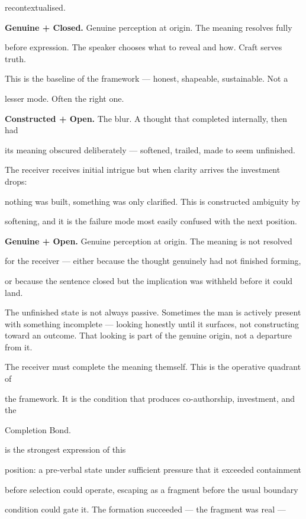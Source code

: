 recontextualised.

\textbf{Genuine + Closed.} Genuine perception at origin. The meaning resolves fully

before expression. The speaker chooses what to reveal and how. Craft serves truth.

This is the baseline of the framework --- honest, shapeable, sustainable. Not a

lesser mode. Often the right one.

\textbf{Constructed + Open.} The blur. A thought that completed internally, then had

its meaning obscured deliberately --- softened, trailed, made to seem unfinished.

The receiver receives initial intrigue but when clarity arrives the investment drops:

nothing was built, something was only clarified. This is constructed ambiguity by

softening, and it is the failure mode most easily confused with the next position.

\textbf{Genuine + Open.} Genuine perception at origin. The meaning is not resolved

for the receiver --- either because the thought genuinely had not finished forming,

or because the sentence closed but the implication was withheld before it could land.

The unfinished state is not always passive. Sometimes the man is actively present
with something incomplete --- looking honestly until it surfaces, not constructing
toward an outcome. That looking is part of the genuine origin, not a departure from it.

The receiver must complete the meaning themself. This is the operative quadrant of

the framework. It is the condition that produces co-authorship, investment, and the

Completion Bond.

\label{cognition_fracture} is the strongest expression of this

position: a pre-verbal state under sufficient pressure that it exceeded containment

before selection could operate, escaping as a fragment before the usual boundary

condition could gate it. The formation succeeded --- the fragment was real ---

